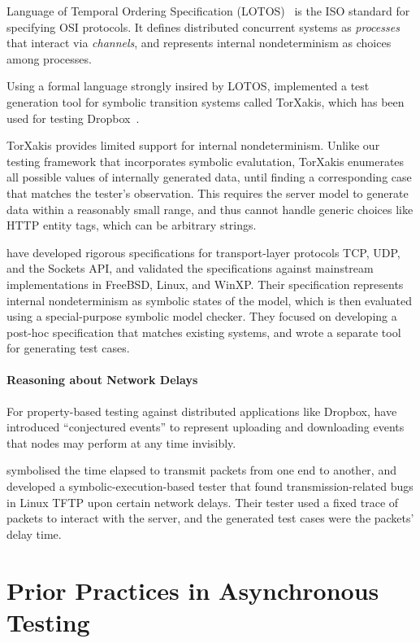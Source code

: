 \documentclass{article}
\theoremstyle{definition}
\begin{document}
Language of Temporal Ordering Specification (LOTOS)~\cite{Bolognesi1987} is the
ISO standard for specifying OSI protocols.  It defines distributed concurrent
systems as {\em processes} that interact via {\em channels}, and represents
internal nondeterminism as choices among processes.

Using a formal language strongly insired by LOTOS, \textcite{torxakis-dropbox}
implemented a test generation tool for symbolic transition systems called
TorXakis, which has been used for testing Dropbox~\cite{torxakis-dropbox}.

TorXakis provides limited support for internal nondeterminism.  Unlike our
testing framework that incorporates symbolic evalutation, TorXakis enumerates
all possible values of internally generated data, until finding a corresponding
case that matches the tester's observation.  This requires the server model to
generate data within a reasonably small range, and thus cannot handle generic
choices like HTTP entity tags, which can be arbitrary strings.

\textcite{netsem} have developed rigorous specifications for transport-layer
protocols TCP, UDP, and the Sockets API, and validated the specifications
against mainstream implementations in FreeBSD, Linux, and WinXP.  Their
specification represents internal nondeterminism as symbolic states of the
model, which is then evaluated using a special-purpose symbolic model checker.
They focused on developing a post-hoc specification that matches existing
systems, and wrote a separate tool for generating test cases.


\paragraph{Reasoning about Network Delays}
For property-based testing against distributed applications like Dropbox,
\textcite{testing-dropbox} have introduced ``conjectured events'' to represent
uploading and downloading events that nodes may perform at any time invisibly.

\textcite{pkt-dyn} symbolised the time elapsed to transmit packets from one end
to another, and developed a symbolic-execution-based tester that found
transmission-related bugs in Linux TFTP upon certain network delays.  Their
tester used a fixed trace of packets to interact with the server, and the
generated test cases were the packets' delay time.

\section{Prior Practices in Asynchronous Testing}
\label{sec:practices}
\end{document}
